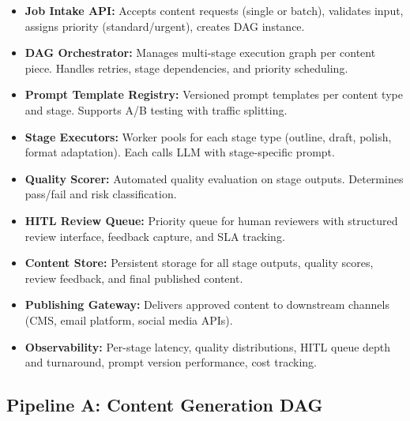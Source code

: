\begin{itemize}
  \item \textbf{Job Intake API:} Accepts content requests (single or batch), validates input, assigns priority (standard/urgent), creates DAG instance.
  \item \textbf{DAG Orchestrator:} Manages multi-stage execution graph per content piece. Handles retries, stage dependencies, and priority scheduling.
  \item \textbf{Prompt Template Registry:} Versioned prompt templates per content type and stage. Supports A/B testing with traffic splitting.
  \item \textbf{Stage Executors:} Worker pools for each stage type (outline, draft, polish, format adaptation). Each calls LLM with stage-specific prompt.
  \item \textbf{Quality Scorer:} Automated quality evaluation on stage outputs. Determines pass/fail and risk classification.
  \item \textbf{HITL Review Queue:} Priority queue for human reviewers with structured review interface, feedback capture, and SLA tracking.
  \item \textbf{Content Store:} Persistent storage for all stage outputs, quality scores, review feedback, and final published content.
  \item \textbf{Publishing Gateway:} Delivers approved content to downstream channels (CMS, email platform, social media APIs).
  \item \textbf{Observability:} Per-stage latency, quality distributions, HITL queue depth and turnaround, prompt version performance, cost tracking.
\end{itemize}

\subsection*{Pipeline A: Content Generation DAG}

